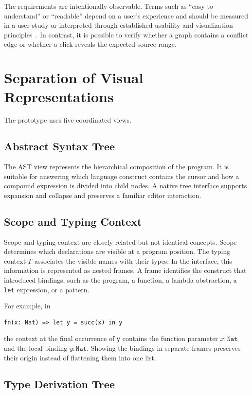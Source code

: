 The requirements are intentionally observable. Terms such as \enquote{easy to understand} or \enquote{readable} depend on a user's experience and should be measured in a user study or interpreted through established usability and visualization principles~\cite{GreenPetre1996,WareInfoVis}. In contrast, it is possible to verify whether a graph contains a conflict edge or whether a click reveals the expected source range.

\section{Separation of Visual Representations}

The prototype uses five coordinated views.

\subsection{Abstract Syntax Tree}

The AST view represents the hierarchical composition of the program. It is suitable for answering which language construct contains the cursor and how a compound expression is divided into child nodes. A native tree interface supports expansion and collapse and preserves a familiar editor interaction.

\subsection{Scope and Typing Context}

Scope and typing context are closely related but not identical concepts. Scope determines which declarations are visible at a program position. The typing context $\Gamma$ associates the visible names with their types. In the interface, this information is represented as nested frames. A frame identifies the construct that introduced bindings, such as the program, a function, a lambda abstraction, a \texttt{let} expression, or a pattern.

For example, in
\begin{verbatim}
fn(x: Nat) => let y = succ(x) in y
\end{verbatim}
the context at the final occurrence of \texttt{y} contains the function parameter $x:\texttt{Nat}$ and the local binding $y:\texttt{Nat}$. Showing the bindings in separate frames preserves their origin instead of flattening them into one list.

\subsection{Type Derivation Tree}

